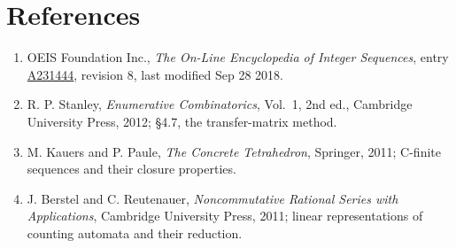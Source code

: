 \documentclass[11pt]{article}
\theoremstyle{definition}
\begin{document}
\section{References}

\begin{enumerate}

\item OEIS Foundation Inc., \emph{The On-Line Encyclopedia of Integer Sequences}, entry \href{https://oeis.org/A231444}{A231444}, revision 8, last modified Sep 28 2018.

\item R. P. Stanley, \emph{Enumerative Combinatorics}, Vol.~1, 2nd ed., Cambridge University Press, 2012; \S4.7, the transfer-matrix method.

\item M. Kauers and P. Paule, \emph{The Concrete Tetrahedron}, Springer, 2011; C-finite sequences and their closure properties.

\item J. Berstel and C. Reutenauer, \emph{Noncommutative Rational Series with Applications}, Cambridge University Press, 2011; linear representations of counting automata and their reduction.

\end{enumerate}
\end{document}
